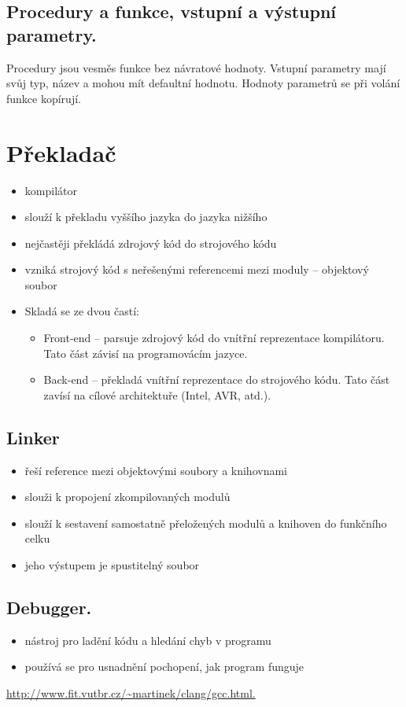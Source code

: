 \documentclass{szzclass}
\begin{document}
\subsection{Procedury a funkce, vstupní a výstupní parametry.}
Procedury jsou vesměs funkce bez návratové hodnoty. Vstupní parametry mají svůj typ, název a mohou mít defaultní hodnotu. Hodnoty parametrů se při volání funkce kopírují.

\section{Překladač}
\begin{itemize}
\item kompilátor
\item slouží k překladu vyššího jazyka do jazyka nižšího
\item nejčastěji překládá zdrojový kód do strojového kódu
\item vzniká strojový kód s neřešenými referencemi mezi moduly – objektový soubor
\item Skladá se ze dvou častí:
  \begin{itemize}
    \item Front-end  – parsuje zdrojový kód do vnítřní reprezentace kompilátoru. Tato část závisí na programovácím jazyce.
    \item Back-end – překladá vnítřní reprezentace do strojového kódu. Tato část zavísí na cílové architektuře (Intel, AVR, atd.).
  \end{itemize}
\end{itemize}
\subsection{Linker}
\begin{itemize}
\item řeší reference mezi objektovými soubory a knihovnami
\item slouži k propojení zkompilovaných modulů
\item slouží k sestavení samostatně přeložených modulů a knihoven do funkčního celku
\item jeho výstupem je spustitelný soubor
\end{itemize}
\subsection{Debugger.}
\begin{itemize}
  \item nástroj pro ladění kódu a hledání chyb v programu
  \item používá se pro usnadnění pochopení, jak program funguje
\end{itemize}

\url{http://www.fit.vutbr.cz/~martinek/clang/gcc.html.}
\end{document}

